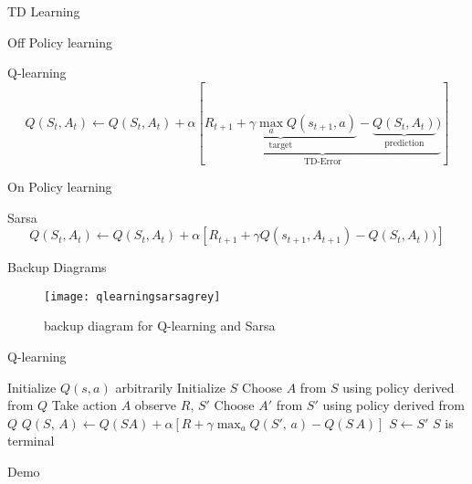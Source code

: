 \begin{frame}{TD Learning}

Off Policy learning 
      \begin{block}{Q-learning}
        \begin{equation*}
            Q(S_t,A_t)\gets Q(S_t,A_t)+\alpha[\underbrace{\underbrace{R_{t+1}+ \gamma \max_a Q(s_{t+1},a)}_{\text{target}}-\underbrace{Q(S_t,A_t)}_{\text{prediction}})}_{\text{TD-Error}}]
        \end{equation*}
      \end{block}

On Policy learning
      \begin{block}{Sarsa}
        \begin{equation*}
            Q(S_t,A_t)\gets Q(S_t,A_t)+\alpha[R_{t+1}+ \gamma Q(s_{t+1},A_{t+1})-Q(S_t,A_t))]
        \end{equation*}
      \end{block}

\end{frame}
\begin{frame}{Backup Diagrams}
  \begin{figure}
  \texttt{[image: qlearningsarsagrey]}
  \caption{backup diagram for Q-learning and Sarsa}
  \end{figure}
\end{frame}
\begin{frame}{Q-learning}
      \begin{algorithmic}[0]
        \State Initialize $Q(s, a)$ arbitrarily
        \State Initialize  $S$
        \Repeat
        \State Choose $A$ from $S$ using policy derived from $Q$
        \State Take action $A$ observe $R,\,S'$
        \State Choose $A'$ from $S'$ using policy derived from $Q$
        \State $Q(S,\,A) \gets Q(SA)+\alpha[R+\gamma\max_{a} Q(S',\,a)-Q(S\,A)]$
        \State $S\gets S'$
        \Until $S$ is terminal
    \end{algorithmic}
  \end{frame}
\begin{frame}[standout]
  Demo
\end{frame}

